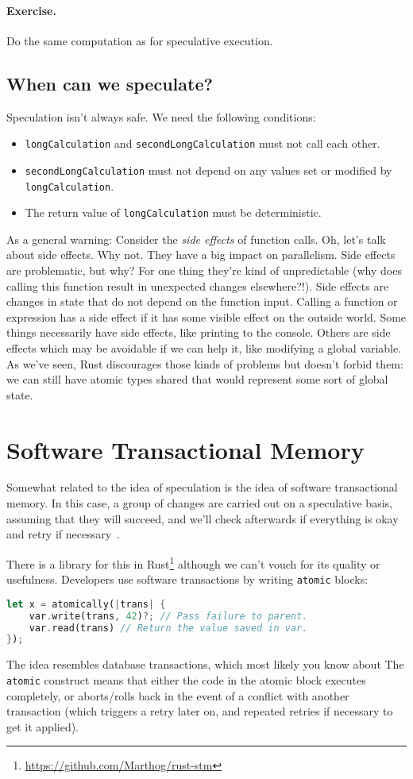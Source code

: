 \paragraph{Exercise.} Do the same computation as for speculative execution.

\subsection*{When can we speculate?}
Speculation isn't always safe. We need the following conditions:
  \begin{itemize}
    \item {\tt longCalculation} and {\tt secondLongCalculation} must not call
      each other.
    \item {\tt secondLongCalculation} must not depend on
      any values set or modified by {\tt longCalculation}.
    \item The return value of {\tt longCalculation} must be deterministic.
  \end{itemize}

As a general warning: Consider the \emph{side effects} of function calls. Oh, let's talk about side effects. Why not. They have a big impact on parallelism. Side effects are problematic, but why? For one thing they're kind of unpredictable (why does calling this function result in unexpected changes elsewhere?!). Side effects are changes in state that do not depend on the function input. Calling a function or expression has a side effect if it has some visible effect on the outside world. Some things necessarily have side effects, like printing to the console. Others are side effects which may be avoidable if we can help it, like modifying a global variable. As we've seen, Rust discourages those kinds of problems but doesn't forbid them: we can still have atomic types shared that would represent some sort of global state.


\section*{Software Transactional Memory}
Somewhat related to the idea of speculation is the idea of software transactional memory. In this case, a group of changes are carried out on a speculative basis, assuming that they will succeed, and we'll check afterwards if everything is okay and retry if necessary~\cite{stm}. 

There is a library for this in Rust\footnote{\url{https://github.com/Marthog/rust-stm}} although we can't vouch for its quality or usefulness. Developers use software transactions by writing {\tt atomic} blocks:
\begin{lstlisting}[language=Rust]
let x = atomically(|trans| {
    var.write(trans, 42)?; // Pass failure to parent.
    var.read(trans) // Return the value saved in var.
});
\end{lstlisting}
The idea resembles database transactions, which most likely you know about
The {\tt atomic} construct means that either the code in
the atomic block executes completely, or aborts/rolls back in the
event of a conflict with another transaction (which triggers a retry
later on, and repeated retries if necessary to get it applied).

